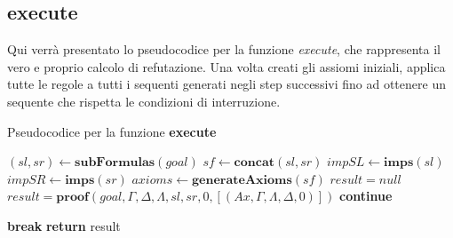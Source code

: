 \documentclass[\main/tesi.tex]{subfiles}
\begin{document}
\subsection{execute}
Qui verrà presentato lo pseudocodice per la funzione \textit{execute}, che rappresenta il vero e proprio calcolo di refutazione. Una volta creati gli assiomi iniziali, applica tutte le regole a tutti i sequenti generati negli step successivi fino ad ottenere un sequente che rispetta le condizioni di interruzione. \\

\begin{algorithm}
    \caption{Pseudocodice per la funzione \textbf{execute}}\label{alg:execute}
    \begin{algorithmic}
        \State $(sl, sr) \gets \textbf{subFormulas}(goal)$
        \State $sf \gets \textbf{concat}(sl, sr)$
        \State $impSL \gets \textbf{imps}(sl)$
        \State $impSR \gets \textbf{imps}(sr)$
        \State $axioms \gets \textbf{generateAxioms}(sf)$
        \State $result = null$
        \State $result = \textbf{proof}(goal, \Gamma, \Delta, \Lambda, sl, sr, 0, [(Ax, \Gamma, \Lambda, \Delta, 0)])$
        \Else
        \State \textbf{continue}
        \EndIf

        \State \textbf{break}
        \EndIf
        \EndFor
        \State \textbf{return} result
        \EndFunction
    \end{algorithmic}
\end{algorithm}
\end{document}
